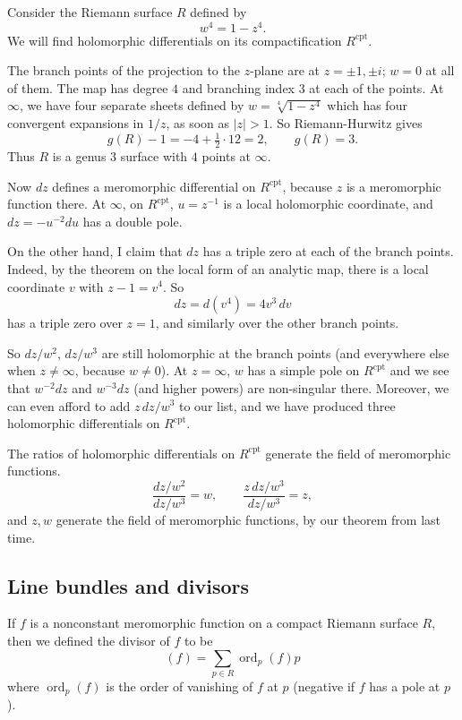 \documentclass[12pt]{article}
\begin{document}
\begin{example}
    Consider the Riemann surface $R$ defined by
\[w^4 = 1 - z^4.
\] We will find holomorphic differentials on its compactification $R^{\mathrm{cpt}}$.

The branch points of the projection to the $z$-plane are at $z = \pm1, \pm i$; $w = 0$ at all of them. The map has degree $4$ and branching index $3$ at each of the points. At $\infty$, we have four separate sheets defined by $w = \sqrt[4]{1 - z^4}$ which has four convergent expansions in $1/z$, as soon as $|z| > 1$.  
So Riemann-Hurwitz gives
\[
g(R) - 1 = -4 + \tfrac{1}{2} \cdot 12 = 2, \qquad g(R) = 3.
\]
Thus $R$ is a genus $3$ surface with $4$ points at $\infty$.

Now $dz$ defines a meromorphic differential on $R^{\mathrm{cpt}}$, because $z$ is a meromorphic function there.  
At $\infty$, on $R^{\mathrm{cpt}}$, $u = z^{-1}$ is a local holomorphic coordinate, and $dz = -u^{-2}du$ has a double pole.

On the other hand, I claim that $dz$ has a triple zero at each of the branch points.  
Indeed, by the theorem on the local form of an analytic map, there is a local coordinate $v$ with $z - 1 = v^4$.  
So
\[
dz = d(v^4) = 4v^3\,dv
\]
has a triple zero over $z = 1$, and similarly over the other branch points.

So $dz/w^2$, $dz/w^3$ are still holomorphic at the branch points (and everywhere else when $z \neq \infty$, because $w \neq 0$).  
At $z = \infty$, $w$ has a simple pole on $R^{\mathrm{cpt}}$ and we see that $w^{-2}dz$ and $w^{-3}dz$ (and higher powers) are non-singular there.  
Moreover, we can even afford to add $z\,dz/w^3$ to our list, and we have produced three holomorphic differentials on $R^{\mathrm{cpt}}$.

The ratios of holomorphic differentials on $R^{\mathrm{cpt}}$ generate the field of meromorphic functions.
\[
\frac{dz/w^2}{dz/w^3} = w, \qquad
\frac{z\,dz/w^3}{dz/w^3} = z,
\]
and $z, w$ generate the field of meromorphic functions, by our theorem from last time.

\end{example}

\subsection{Line bundles and divisors}
If $f$ is a nonconstant meromorphic function on a compact Riemann surface $R$, then we defined the divisor of $f$ to be \[(f) = \sum_{p \in R} \operatorname{ord}_p(f) p\] where $\operatorname{ord}_p(f)$ is the order of vanishing of $f$ at $p$ (negative if $f$ has a pole at $p$). 
\end{document}
